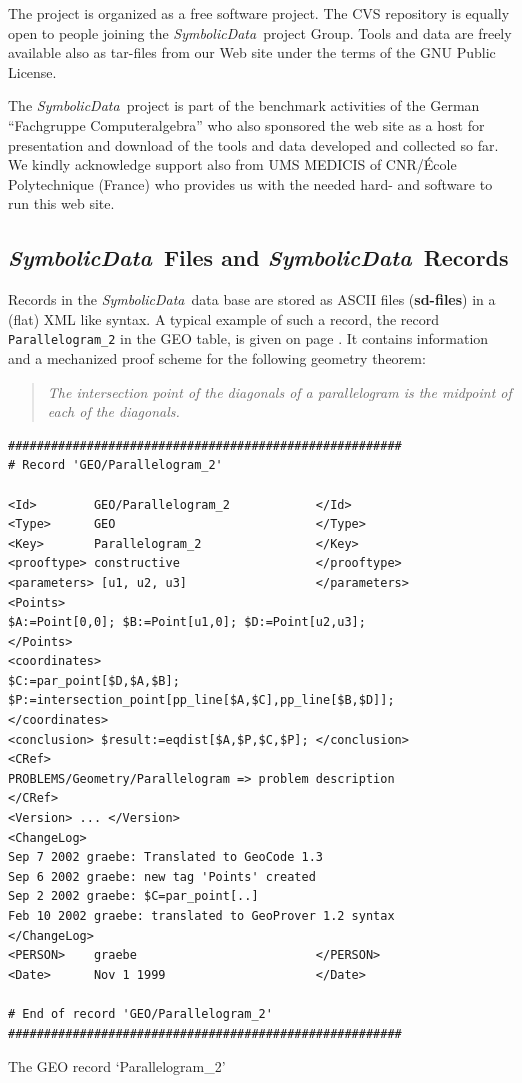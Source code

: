 \documentclass[11pt]{article}
\newcommand{\SD}{\textit{Symbolic\-Data}}
\begin{document}
The project is organized as a free software project. The CVS repository is
equally open to people joining the \SD\ project Group. Tools and data are
freely available also as tar-files from our Web site under the terms of the
GNU Public License.  
\medskip

The \SD\ project is part of the benchmark activities of the German
``Fachgruppe Computeralgebra'' who also sponsored the web site
\cite{SymbolicData} as a host for presentation and download of the tools and
data developed and collected so far.  We kindly acknowledge support also from
UMS MEDICIS of CNR/\'Ecole Polytechnique (France) who provides us with the
needed hard- and software to run this web site.  \medskip

\subsection{\SD\ Files and \SD\ Records}

Records in the \SD\ data base are stored as ASCII files ({\bf sd-files}) in a
(flat) XML like syntax. A typical example of such a record, the record
\verb|Parallelogram_2| in the GEO table, is given on page \pageref{table:1}.
It contains information and a mechanized proof scheme for the following
geometry theorem:
\begin{quote}\it
  The intersection point of the diagonals of a parallelogram is the midpoint
  of each of the diagonals.
\end{quote}

\begin{table}[p]\label{table:1}{
\begin{verbatim}
#######################################################
# Record 'GEO/Parallelogram_2'

<Id>        GEO/Parallelogram_2            </Id>
<Type>      GEO                            </Type>
<Key>       Parallelogram_2                </Key>
<prooftype> constructive                   </prooftype>
<parameters> [u1, u2, u3]                  </parameters>
<Points> 
$A:=Point[0,0]; $B:=Point[u1,0]; $D:=Point[u2,u3]; 
</Points>
<coordinates> 
$C:=par_point[$D,$A,$B];
$P:=intersection_point[pp_line[$A,$C],pp_line[$B,$D]];
</coordinates>
<conclusion> $result:=eqdist[$A,$P,$C,$P]; </conclusion>
<CRef>      
PROBLEMS/Geometry/Parallelogram => problem description 
</CRef>
<Version> ... </Version>
<ChangeLog>
Sep 7 2002 graebe: Translated to GeoCode 1.3
Sep 6 2002 graebe: new tag 'Points' created
Sep 2 2002 graebe: $C=par_point[..]
Feb 10 2002 graebe: translated to GeoProver 1.2 syntax
</ChangeLog>
<PERSON>    graebe                         </PERSON>
<Date>      Nov 1 1999                     </Date>
  
# End of record 'GEO/Parallelogram_2'
#######################################################
\end{verbatim}}
\centerline{The GEO record `Parallelogram\_2'}
\end{table}
\end{document}

